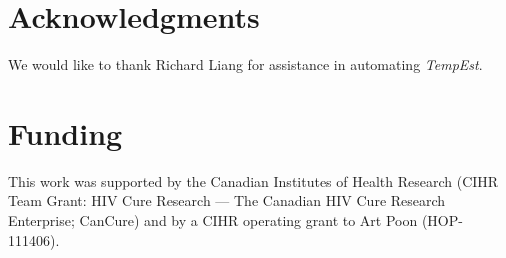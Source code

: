 \documentclass{bioinfo}
\begin{document}
\section*{Acknowledgments} \label{sec:ackn}
We would like to thank Richard Liang for assistance in automating \emph{TempEst}.

\section*{Funding} \label{sec:fund}
This work was supported by the Canadian Institutes of Health Research (CIHR Team Grant: HIV Cure Research --- The Canadian HIV Cure Research Enterprise; CanCure) and by a CIHR operating grant to Art Poon (HOP-111406).



\end{document}
